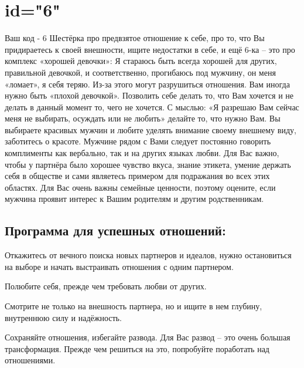 \section{id="6"}{Ваш код - 6}
Шестёрка про предвзятое отношение к себе, про то, что Вы придираетесь 
к своей внешности, ищите недостатки в себе, и ещё 6-ка – это про 
комплекс «хорошей девочки»: Я стараюсь быть всегда хорошей для других, 
правильной девочкой, и соответственно, прогибаюсь под мужчину, он меня 
«ломает», я себя теряю. Из-за этого могут разрушиться отношения. Вам 
иногда нужно быть «плохой девочкой». Позволить себе делать то, что Вам 
хочется и не делать в данный момент то, чего не хочется. С мыслью: 
«Я разрешаю Вам сейчас меня не выбирать, осуждать или не любить» 
делайте то, что нужно Вам. Вы выбираете красивых мужчин и любите 
уделять внимание своему внешнему виду, заботитесь о красоте. Мужчине 
рядом с Вами следует постоянно говорить комплименты как вербально, 
так и на других языках любви. Для Вас важно, чтобы у партнёра было 
хорошее чувство вкуса, знание этикета, умение держать себя в обществе 
и сами являетесь примером для подражания во всех этих областях. Для 
Вас очень важны семейные ценности, поэтому оцените, если мужчина 
проявит интерес к Вашим родителям и другим родственникам.
\subsection{Программа для успешных отношений:}
\item Откажитесь от вечного поиска новых партнеров и идеалов, нужно 
остановиться на выборе и начать выстраивать отношения с одним партнером.
\item Полюбите себя, прежде чем требовать любви от других.
\item Смотрите не только на внешность партнера, но и ищите в нем 
глубину, внутреннюю силу и надёжность.
\item Сохраняйте отношения, избегайте развода. Для Вас развод – это 
очень большая трансформация. Прежде чем решиться на это, попробуйте 
поработать над отношениями.
\endsubsection
\endsection

